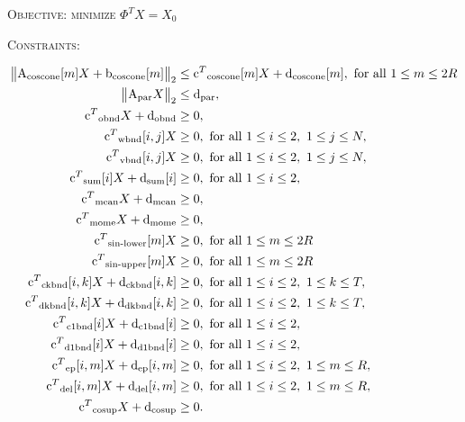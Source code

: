\documentclass[12pt]{article}
\numberwithin{equation}{section}
\begin{document}
\noindent\textsc{Objective: minimize} $ \Phi^TX = X_0$ 

\vspace{0.15cm} 





\noindent\textsc{Constraints: }  
\begin{scriptsize}
\begin{align*}
\big\| \text{A\textsubscript{coscone}}[m]X + \text{b\textsubscript{coscone}}[m] \big\|_2 &\leq \text{c$^T$\textsubscript{coscone}}[m]X + \text{d\textsubscript{coscone}}[m], \text{ for all } 1 \leq m \leq 2R \\
\big\| \text{A\textsubscript{par}}X  \big\|_2 &\leq  \text{d\textsubscript{par}},  \\
 \text{c$^T$\textsubscript{obnd}}X+\text{d\textsubscript{obnd}} &\geq 0, \\
 \text{c$^T$\textsubscript{wbnd}}[i,j]X &\geq 0,  \text{ for all } 1 \leq i \leq 2, \  1 \leq j \leq N,\\
  \text{c$^T$\textsubscript{vbnd}}[i,j]X &\geq 0,  \text{ for all } 1 \leq i \leq 2, \  1 \leq j \leq N,\\
 \text{c$^T$\textsubscript{sum}}[i]X   + \text{d\textsubscript{sum}}[i]&\geq 0,  \text{ for all } 1 \leq i \leq 2, \\
\text{c$^T$\textsubscript{mean}}X   + \text{d\textsubscript{mean}}&\geq 0,  \\
\text{c$^T$\textsubscript{mome}}X   + \text{d\textsubscript{mome}}&\geq 0,  \\
 \text{c$^T$\textsubscript{sin-lower}}[m]X &\geq 0,  \text{ for all } 1 \leq m \leq 2R \\
\text{c$^T$\textsubscript{sin-upper}}[m]X&\geq 0,    \text{ for all } 1 \leq m \leq 2R \\
\text{c$^T$\textsubscript{ckbnd}}[i,k]X   + \text{d\textsubscript{ckbnd}}[i,k] &\geq 0, \text{ for all } 1 \leq i \leq 2, \ 1 \leq k \leq T, \\
\text{c$^T$\textsubscript{dkbnd}}[i,k]X   + \text{d\textsubscript{dkbnd}}[i,k] &\geq 0, \text{ for all } 1 \leq i \leq 2, \ 1 \leq k \leq T, \\
\text{c$^T$\textsubscript{c1bnd}}[i]X   + \text{d\textsubscript{c1bnd}}[i] &\geq 0, \text{ for all } 1 \leq i \leq 2, \\
\text{c$^T$\textsubscript{d1bnd}}[i]X   + \text{d\textsubscript{d1bnd}}[i] &\geq 0, \text{ for all } 1 \leq i \leq 2, \\
\text{c$^T$\textsubscript{ep}}[i,m]X   + \text{d\textsubscript{ep}}[i,m] &\geq 0, \text{ for all } 1 \leq i \leq 2, \ 1 \leq m \leq R,  \\
\text{c$^T$\textsubscript{del}}[i,m]X   + \text{d\textsubscript{del}}[i,m] &\geq 0, \text{ for all } 1 \leq i \leq 2, \ 1 \leq m \leq R, \\
\text{c$^T$\textsubscript{cosup}}X   + \text{d\textsubscript{cosup}} &\geq 0.  \end{align*}

\end{scriptsize}
\end{document}
